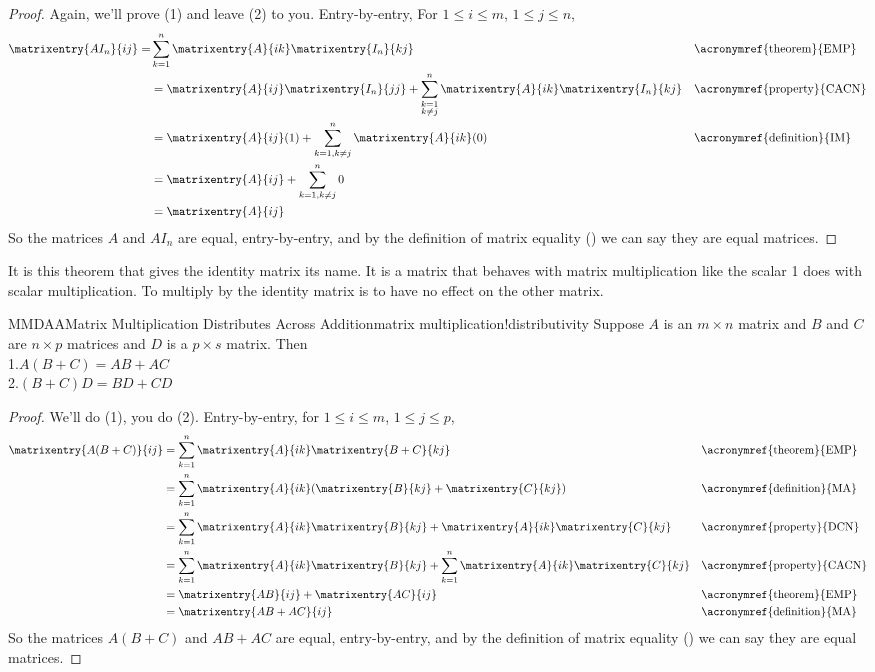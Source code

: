 %
\begin{proof}
Again, we'll prove (1) and leave (2) to you.  Entry-by-entry,    For $1\leq i\leq m$, $1\leq j\leq n$,
%
\begin{align*}
\matrixentry{AI_n}{ij}=&
\sum_{k=1}^{n}\matrixentry{A}{ik}\matrixentry{I_n}{kj}
&&\text{\acronymref{theorem}{EMP}}\\
%
&=\matrixentry{A}{ij}\matrixentry{I_n}{jj}+\sum_{\substack{k=1\\k\neq j}}^{n}\matrixentry{A}{ik}\matrixentry{I_n}{kj}
&&\text{\acronymref{property}{CACN}}\\
%
&=\matrixentry{A}{ij}(1)+\sum_{k=1, k\neq j}^{n}\matrixentry{A}{ik}(0)
&&\text{\acronymref{definition}{IM}}\\
%
&=\matrixentry{A}{ij}+\sum_{k=1, k\neq j}^{n}0\\
&=\matrixentry{A}{ij}
\end{align*}
%
So the matrices $A$ and $AI_n$ are equal, entry-by-entry, and by the definition of matrix equality () we can say they are equal matrices.
\end{proof}
%
It is this theorem that gives the identity matrix its name.  It is a matrix that behaves with matrix multiplication like the scalar 1 does with scalar multiplication.  To multiply by the identity matrix is to have no effect on the other matrix.
%
\begin{theorem}{MMDAA}{Matrix Multiplication Distributes Across Addition}{matrix multiplication!distributivity}
Suppose $A$ is an $m\times n$ matrix and $B$ and $C$ are $n\times p$ matrices and $D$ is a $p\times s$ matrix.    Then\\
1.\quad  $A(B+C)=AB+AC$\\
2.\quad  $(B+C)D=BD+CD$
\end{theorem}
%
\begin{proof}
We'll do (1), you do (2).  Entry-by-entry, for $1\leq i\leq m$, $1\leq j\leq p$,
%
\begin{align*}
\matrixentry{A(B+C)}{ij}
&=
\sum_{k=1}^{n}\matrixentry{A}{ik}\matrixentry{B+C}{kj}&&\text{\acronymref{theorem}{EMP}}\\
&=\sum_{k=1}^{n}\matrixentry{A}{ik}(\matrixentry{B}{kj}+\matrixentry{C}{kj})&&\text{\acronymref{definition}{MA}}\\
&=\sum_{k=1}^{n}\matrixentry{A}{ik}\matrixentry{B}{kj}+\matrixentry{A}{ik}\matrixentry{C}{kj}
&&\text{\acronymref{property}{DCN}}\\
&=\sum_{k=1}^{n}\matrixentry{A}{ik}\matrixentry{B}{kj}+\sum_{k=1}^{n}\matrixentry{A}{ik}\matrixentry{C}{kj}&&\text{\acronymref{property}{CACN}}\\
&=\matrixentry{AB}{ij}+\matrixentry{AC}{ij}&&\text{\acronymref{theorem}{EMP}}\\
&=\matrixentry{AB+AC}{ij}&&\text{\acronymref{definition}{MA}}
\end{align*}
%
So the matrices $A(B+C)$ and $AB+AC$ are equal, entry-by-entry, and by the definition of matrix equality () we can say they are equal matrices.
\end{proof}
